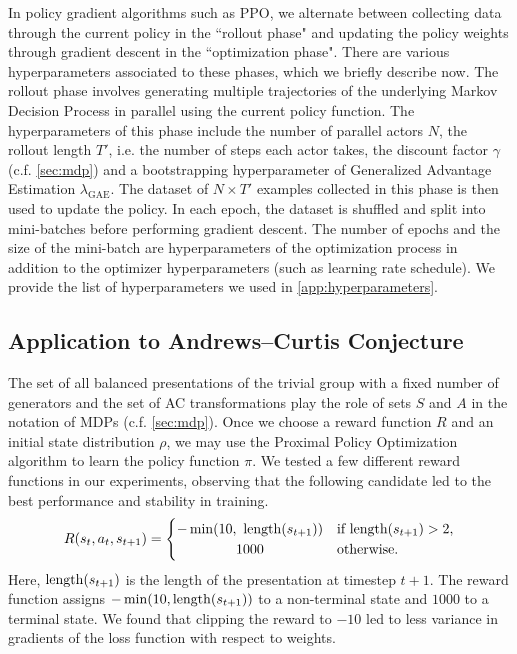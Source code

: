 In policy gradient algorithms such as PPO, we alternate between collecting data through the current policy in the ``rollout phase" and updating the policy weights through gradient descent in the ``optimization phase". There are various hyperparameters associated to these phases, which we briefly describe now. The rollout phase involves generating multiple trajectories of the underlying Markov Decision Process in parallel using the current policy function.
The hyperparameters of this phase include the number of parallel actors $N$, the rollout length $T'$, i.e. the number of steps each actor takes, the discount factor $\gamma$ (c.f. \autoref{sec:mdp}) and a bootstrapping hyperparameter of Generalized Advantage Estimation $\lambda_{\text{GAE}}$. The dataset of $N \times T'$ examples collected in this phase is then used to update the policy. In each epoch, the dataset is shuffled and split into mini-batches before performing gradient descent. The number of epochs and the size of the mini-batch are hyperparameters of the optimization process in addition to the optimizer hyperparameters (such as learning rate schedule). We provide the list of hyperparameters we used in  \autoref{app:hyperparameters}.

\subsection{Application to Andrews--Curtis Conjecture}\label{sec:application}

The set of all balanced presentations of the trivial group with a fixed number of generators and the set of AC transformations play the role of sets $S$ and $A$ in the notation of MDPs (c.f. \autoref{sec:mdp}). Once we choose a reward function $R$ and an initial state distribution $\rho$, we may use the Proximal Policy Optimization algorithm to learn the policy function $\pi$. We tested a few different reward functions in our experiments, observing that the following candidate led to the best performance and stability in training.
\[
R(s_{t}, a_{t}, s_{t+1}) =
\begin{cases}
	-\min(10, \ \length(s_{t+1})) & \text{if length}(s_{t+1}) > 2, \\
	\hfil 1000 & \text{otherwise.}
\end{cases}
\]
Here, $\operatorname{length}(s_{t+1})$ is the length of the presentation at timestep $t+1$. The reward function assigns $-\min(10, \operatorname{length}(s_{t+1}))$ to a non-terminal state and $1000$ to a terminal state. We found that clipping the reward to $-10$ led to less variance in gradients of the loss function with respect to weights.


